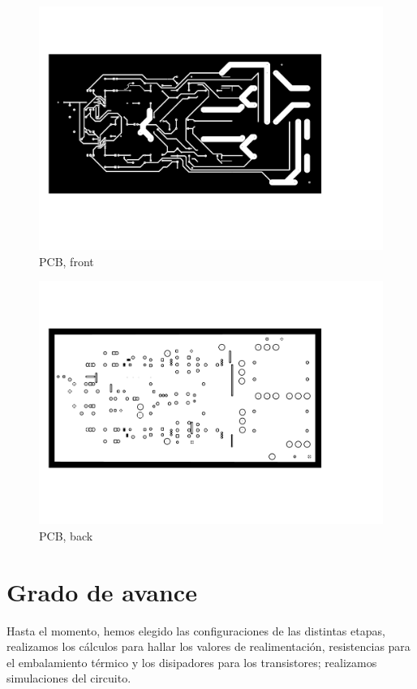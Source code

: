 \documentclass[a4paper,12pt,twoside]{article}
\begin{document}
\begin{figure}[H]
    \centering
    \includegraphics[height=0.7\textwidth]{img/PCB/amplificador-F.pdf}
    \caption{PCB, front}
    \label{fig:pcb2}
\end{figure}

\begin{figure}[H]
    \centering
    \includegraphics[height=0.7\textwidth]{img/PCB/amplificador-B.pdf}
    \caption{PCB, back}
    \label{fig:pcb3}
\end{figure}

\section{Grado de avance}

Hasta el momento, hemos elegido las configuraciones de las distintas etapas, realizamos los cálculos para hallar los valores de realimentación, resistencias para el embalamiento térmico y los disipadores para los transistores; realizamos simulaciones del circuito.
\end{document}
